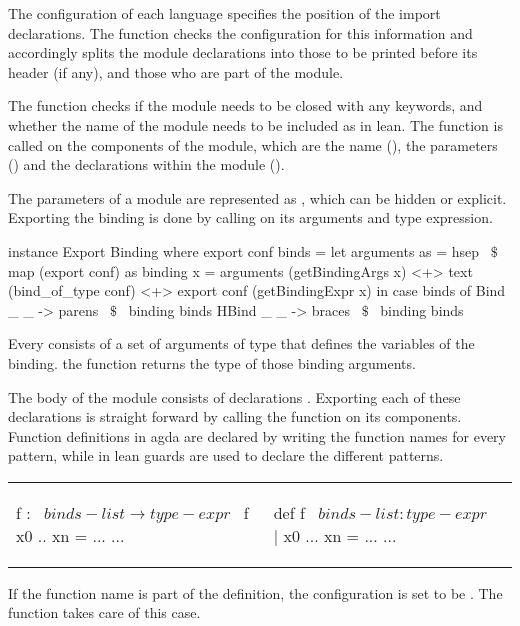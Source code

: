 The configuration of each language specifies the position of the import declarations. The function  checks the configuration for this information and accordingly splits the module declarations into those to be printed before its header (if any), and those who are part of the module. 

The   function checks if the module needs to be closed with any keywords, and whether the name of the module needs to be included as in lean. The  function is called on the components of the module, which are the name (), the parameters () and the declarations within the module (). 

The parameters of a module are represented as \lstmath{[Binding]}, which can be hidden or explicit. Exporting the binding is done by calling  on its arguments and type expression.  
\begin{hscode}
instance Export Binding where
  export conf binds =
    let arguments as = hsep ~$\$$~ map (export conf) as
        binding x =  
          arguments (getBindingArgs x) <+> text (bind_of_type conf) 
          <+> export conf (getBindingExpr x)
    in case binds of
      Bind  _ _ -> parens ~$\$$~ binding binds
      HBind _ _ -> braces ~$\$$~ binding binds

\end{hscode}
Every  consists of a set of arguments of type  that defines the variables of the binding. the function  returns the type of those binding arguments. 

The body of the module consists of declarations \lstmath{[Decl]}. Exporting each of these declarations is straight forward by calling the  function on its components. Function definitions in agda are declared by writing the function names for every pattern, while in lean guards are used to declare the different patterns. 
\newline
\begin{tabular}{p{18em} p{10em}}
\begin{agdacode} 
f : ~$binds-list \to type-expr$~   
f x0 .. xn = ... 
...    
\end{agdacode}  
&
\begin{leancode}
def f ~$binds-list : type-expr$~ 
| x0 ... xn = ... 
... 
\end{leancode}
\end{tabular}
\newline
If the function name is part of the definition, the configuration is set to be . The function  takes care of this case. 

